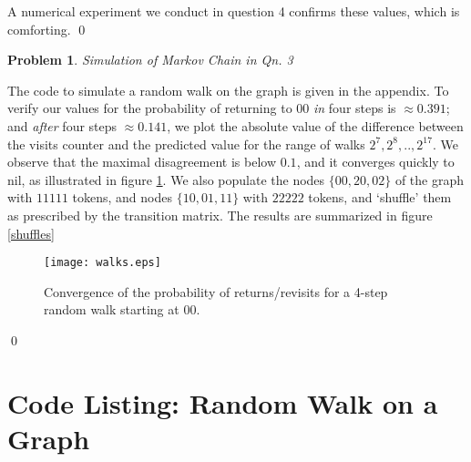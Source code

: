 \documentclass[8pt,notitlepage]{report}
\newtheorem{problem}{Problem}
\newenvironment{solution}[1][Solution]{\begin{trivlist}
    \item[\hskip \labelsep {\bfseries #1}]}{\end{trivlist}}
\begin{document}
\begin{solution}
A numerical experiment we conduct in question 4 confirms these values, which is comforting.
\qed
\end{solution}

\begin{problem}
Simulation of Markov Chain in Qn. 3
\end{problem}

\begin{solution}
The code to simulate a random walk on the graph is given in the appendix.
To verify our values for the probability of returning to $00$ {\it in} four steps is $\approx 0.391$; 
and {\it after} four steps $\approx 0.141$, we plot the absolute value of the difference between the visits counter 
and the predicted value for the range of walks $2^7,2^8,..,2^{17}$. We observe that the maximal disagreement 
is below $0.1$, and it converges quickly to nil, as illustrated in figure \ref{walks}.
We also populate the nodes $\{ 00, 20, 02\}$ of the graph with $11111$ tokens, and nodes $\{ 10,01,11 \}$ with $22222$
tokens, and `shuffle' them as prescribed by the transition matrix. The results are summarized in figure \ref{shuffles}

\begin{figure}[h]
 \texttt{[image: walks.eps]}
 \caption{Convergence of the probability of returns/revisits for a 4-step random walk starting at $00$.
   \label{walks}
  }
\end{figure}

\qed
\end{solution}

\newpage
\appendix
\section*{Code Listing: Random Walk on a Graph}
% 
\end{document}
